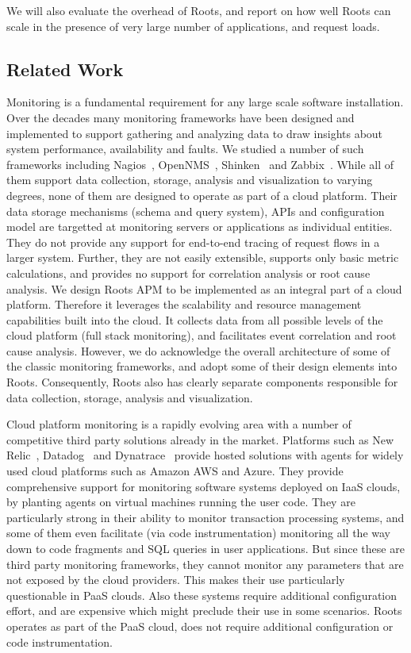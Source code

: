 We will also evaluate the overhead of Roots, and report on how well Roots can
scale in the presence of very large number of applications, and request loads.

\subsection{Related Work}
Monitoring is a fundamental requirement for any large scale software installation.
Over the decades many monitoring frameworks have been designed and implemented to
support gathering and analyzing data to draw insights about system performance,
availability and faults. We studied a number of such frameworks including Nagios~\cite{nagios},
OpenNMS~\cite{opennms}, Shinken~\cite{shinken} and Zabbix~\cite{zabbix}. 
While all of them support data collection, storage,
analysis and visualization to varying degrees, none of them are designed
to operate as part of a cloud platform. Their data storage mechanisms (schema and query system),
APIs and configuration model are targetted at monitoring servers or 
applications as individual entities. They do not provide any support for
end-to-end tracing of request flows in a larger system. Further, they are not easily extensible,
supports only basic metric calculations, and provides no support for correlation
analysis or root cause analysis. We design Roots APM to be implemented as an integral
part of a cloud platform. Therefore it leverages the scalability and resource
management capabilities built into the cloud. It collects data from all
possible levels of the cloud platform (full stack monitoring), and facilitates
event correlation and root cause analysis. However, we do acknowledge the
overall architecture of some of the classic monitoring frameworks, and
adopt some of their design elements into Roots. Consequently, Roots also
has clearly separate components responsible for data collection, storage, analysis
and visualization.

Cloud platform monitoring is a rapidly evolving area with a number of 
competitive third party solutions already in the market. Platforms such
as New Relic~\cite{newrelic}, Datadog~\cite{datadog} and Dynatrace~\cite{dynatrace} 
provide hosted solutions with
agents for widely used cloud platforms such as Amazon AWS and Azure.
They provide comprehensive support for monitoring software
systems deployed on IaaS clouds, by planting agents on virtual
machines running the user code.
They are particularly strong in their ability to monitor transaction
processing systems, and some of them even facilitate (via code instrumentation) 
monitoring all the way down to code fragments and SQL queries in user applications.
But since these are third party monitoring frameworks, they cannot
monitor any parameters that are not exposed by the
cloud providers. This makes their use particularly questionable in
PaaS clouds.  
Also these systems require additional configuration effort, and are expensive
which might preclude their use in some scenarios. Roots operates as part
of the PaaS cloud, does not require additional configuration or code
instrumentation.

